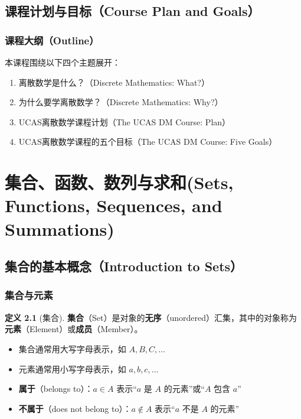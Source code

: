 \documentclass[UTF8,11pt,a4paper]{ctexbook}   %
\theoremstyle{definition}
\newtheorem{definition}{定义}[section]
\begin{document}
\section{课程计划与目标（Course Plan and Goals）}

\subsection{课程大纲（Outline）}

本课程围绕以下四个主题展开：
\begin{enumerate}[leftmargin=2em]
    \item 离散数学是什么？（Discrete Mathematics: What?）
    \item 为什么要学离散数学？（Discrete Mathematics: Why?）
    \item UCAS离散数学课程计划（The UCAS DM Course: Plan）
    \item UCAS离散数学课程的五个目标（The UCAS DM Course: Five Goals）
\end{enumerate}

\chapter{集合、函数、数列与求和(Sets, Functions, Sequences, and Summations)}

\section{集合的基本概念（Introduction to Sets）}

\subsection{集合与元素}

\begin{definition}[集合]
\textbf{集合}（Set）是对象的\textbf{无序}（unordered）汇集，其中的对象称为\textbf{元素}（Element）或\textbf{成员}（Member）。
\end{definition}

\begin{itemize}[leftmargin=2em]
    \item 集合通常用大写字母表示，如 $A, B, C, \ldots$
    \item 元素通常用小写字母表示，如 $a, b, c, \ldots$
    \item \textbf{属于}（belongs to）：$a \in A$ 表示``$a$ 是 $A$ 的元素''或``$A$ 包含 $a$''
    \item \textbf{不属于}（does not belong to）：$a \notin A$ 表示``$a$ 不是 $A$ 的元素''
\end{itemize}
\end{document}
